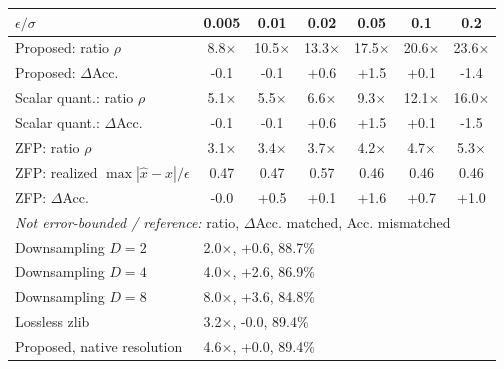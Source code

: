 \begin{tabular}{lcccccc}
\toprule
$\epsilon/\sigma$ & 0.005 & 0.01 & 0.02 & 0.05 & 0.1 & 0.2 \\
\midrule
Proposed: ratio $\rho$ & 8.8$\times$ & 10.5$\times$ & 13.3$\times$ & 17.5$\times$ & 20.6$\times$ & 23.6$\times$ \\
Proposed: $\Delta$Acc. & -0.1 & -0.1 & +0.6 & +1.5 & +0.1 & -1.4 \\
Scalar quant.: ratio $\rho$ & 5.1$\times$ & 5.5$\times$ & 6.6$\times$ & 9.3$\times$ & 12.1$\times$ & 16.0$\times$ \\
Scalar quant.: $\Delta$Acc. & -0.1 & -0.1 & +0.6 & +1.5 & +0.1 & -1.5 \\
ZFP: ratio $\rho$ & 3.1$\times$ & 3.4$\times$ & 3.7$\times$ & 4.2$\times$ & 4.7$\times$ & 5.3$\times$ \\
ZFP: realized $\max|\hat{x}-x|/\epsilon$ & 0.47 & 0.47 & 0.57 & 0.46 & 0.46 & 0.46 \\
ZFP: $\Delta$Acc. & -0.0 & +0.5 & +0.1 & +1.6 & +0.7 & +1.0 \\
\midrule
\multicolumn{7}{l}{\emph{Not error-bounded / reference:} ratio, $\Delta$Acc. matched, Acc. mismatched} \\
Downsampling $D=2$ & \multicolumn{6}{l}{2.0$\times$, +0.6, 88.7\%} \\
Downsampling $D=4$ & \multicolumn{6}{l}{4.0$\times$, +2.6, 86.9\%} \\
Downsampling $D=8$ & \multicolumn{6}{l}{8.0$\times$, +3.6, 84.8\%} \\
Lossless zlib & \multicolumn{6}{l}{3.2$\times$, -0.0, 89.4\%} \\
Proposed, native resolution & \multicolumn{6}{l}{4.6$\times$, +0.0, 89.4\%} \\
\bottomrule
\end{tabular}
